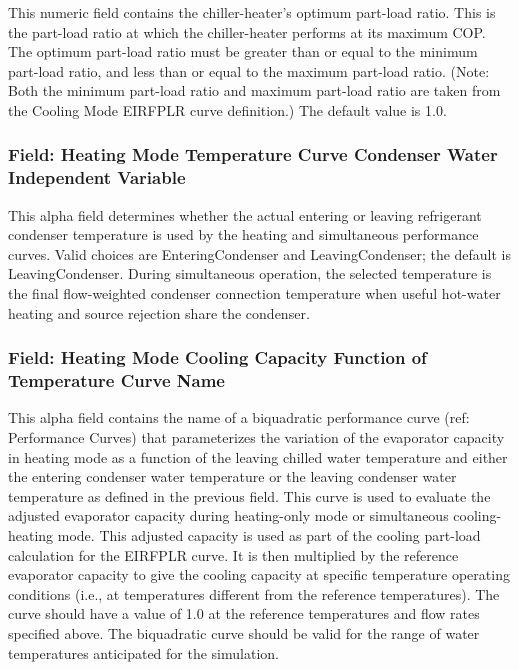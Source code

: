 This numeric field contains the chiller-heater's optimum part-load ratio. This is the part-load ratio at which the chiller-heater performs at its maximum COP. The optimum part-load ratio must be greater than or equal to the minimum part-load ratio, and less than or equal to the maximum part-load ratio. (Note: Both the minimum part-load ratio and maximum part-load ratio are taken from the Cooling Mode EIRFPLR curve definition.) The default value is 1.0.

\subsubsection{Field: Heating Mode Temperature Curve Condenser Water Independent Variable}\label{field-heating-mode-temperature-curve-condenser-water-independent-variable}

This alpha field determines whether the actual entering or leaving refrigerant condenser temperature is used by the heating and simultaneous performance curves. Valid choices are EnteringCondenser and LeavingCondenser; the default is LeavingCondenser. During simultaneous operation, the selected temperature is the final flow-weighted condenser connection temperature when useful hot-water heating and source rejection share the condenser.

\subsubsection{Field: Heating Mode Cooling Capacity Function of Temperature Curve Name}\label{field-heating-mode-cooling-capacity-function-of-temperature-curve-name}

This alpha field contains the name of a biquadratic performance curve (ref: Performance Curves) that parameterizes the variation of the evaporator capacity in heating mode as a function of the leaving chilled water temperature and either the entering condenser water temperature or the leaving condenser water temperature as defined in the previous field. This curve is used to evaluate the adjusted evaporator capacity during heating-only mode or simultaneous cooling-heating mode. This adjusted capacity is used as part of the cooling part-load calculation for the EIRFPLR curve. It is then multiplied by the reference evaporator capacity to give the cooling capacity at specific temperature operating conditions (i.e., at temperatures different from the reference temperatures). The curve should have a value of 1.0 at the reference temperatures and flow rates specified above. The biquadratic curve should be valid for the range of water temperatures anticipated for the simulation.

